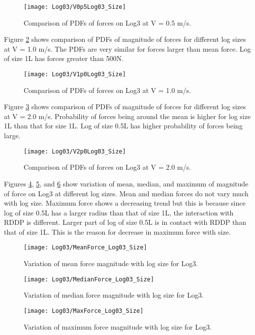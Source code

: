 \begin{figure}
\centering
\texttt{[image: Log03/V0p5Log03\_Size]}
\caption{\label{fig:V0p5Log03_Size}Comparison of PDFs of forces on Log3 at V = 0.5 m/s.}
\end{figure}

\noindent Figure \ref{fig:V1p0Log03_Size} shows comparison of PDFs of magnitude of forces for different log sizes at V = 1.0 m/s. The PDFs are very similar for forces larger than mean force. Log of size 1L has forces greater than 500N. 

\begin{figure}
\centering
\texttt{[image: Log03/V1p0Log03\_Size]}
\caption{\label{fig:V1p0Log03_Size}Comparison of PDFs of forces on Log3 at V = 1.0 m/s.}
\end{figure}

\noindent Figure \ref{fig:V2p0Log03_Size} shows comparison of PDFs of magnitude of forces for different log sizes at V = 2.0 m/s. Probability of forces being around the mean is higher for log size 1L than that for size 1L. Log of size 0.5L has higher probability of forces being large.

\begin{figure}
\centering
\texttt{[image: Log03/V2p0Log03\_Size]}
\caption{\label{fig:V2p0Log03_Size}Comparison of PDFs of forces on Log3 at V = 2.0 m/s.}
\end{figure}

\noindent Figures \ref{fig:MeanForce_Log03_Size}, \ref{fig:MedianForce_Log03_Size}, and \ref{fig:MaxForce_Log03_Size} show variation of mean, median, and maximum of magnitude of force on Log3 at different log sizes. Mean and median forces do not vary much with log size. Maximum force shows a decreasing trend but this is because since log of size 0.5L has a larger radius than that of size 1L, the interaction with RDDP is different. Larger part of log of size 0.5L  is in contact with RDDP than that of size 1L. This is the reason for decrease in maximum force with size. 

\begin{figure}
\centering
\texttt{[image: Log03/MeanForce\_Log03\_Size]}
\caption{\label{fig:MeanForce_Log03_Size}Variation of mean force magnitude with log size for Log3.}
\end{figure}
\begin{figure}
\centering
\texttt{[image: Log03/MedianForce\_Log03\_Size]}
\caption{\label{fig:MedianForce_Log03_Size}Variation of median force magnitude with log size for Log3.}
\end{figure}
\begin{figure}
\centering
\texttt{[image: Log03/MaxForce\_Log03\_Size]}
\caption{\label{fig:MaxForce_Log03_Size}Variation of maximum force magnitude with log size for Log3.}
\end{figure}

